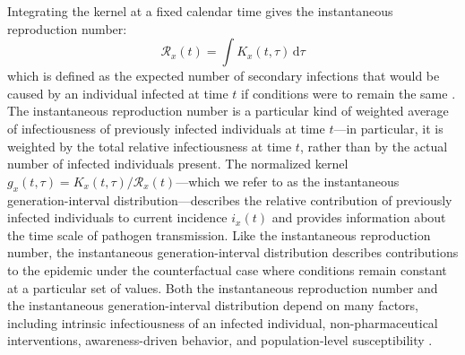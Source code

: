 \documentclass[12pt]{article}
\newcommand{\RR}{\ensuremath{{\mathcal R}}\xspace}
\newcommand{\dd}[1]{\ensuremath{\, \mathrm{d}#1}}
\newcommand{\dtau}{\dd{\tau}}
\begin{document}
Integrating the kernel at a fixed calendar time gives the instantaneous reproduction number:
\begin{equation}
\RR_x(t) = \int K_x(t, \tau) \dtau
\label{eq:instR}
\end{equation}
which is defined as the expected number of secondary infections that would be caused by an individual infected at time $t$ if conditions were to remain the same \citep{fraser2007estimating}.
The instantaneous reproduction number is a particular kind of weighted average of infectiousness of previously infected individuals at time $t$---in particular, it is weighted by the total relative infectiousness at time $t$, rather than by the actual number of infected individuals present.
The normalized kernel $g_x(t, \tau) = K_x(t, \tau)/\RR_x(t)$---which we refer to as the instantaneous generation-interval distribution---describes the relative contribution of previously infected individuals to current incidence $i_x(t)$ and provides information about the time scale of pathogen transmission.
Like the instantaneous reproduction number, the instantaneous generation-interval distribution describes contributions to the epidemic under the counterfactual case where conditions remain constant at a particular set of values. 
Both the instantaneous reproduction number and the instantaneous generation-interval distribution depend on many factors, including intrinsic infectiousness of an infected individual, non-pharmaceutical interventions, awareness-driven behavior, and population-level susceptibility \citep{fraser2007estimating}.
\end{document}
